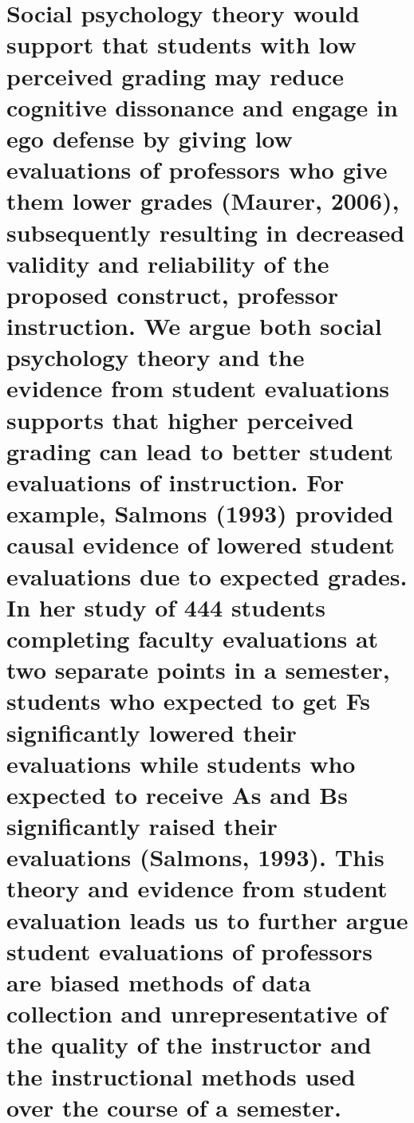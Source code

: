 \documentclass[man]{apa6}
\theoremstyle{definition}
\theoremstyle{definition}
\theoremstyle{definition}
\theoremstyle{remark}
\begin{document}
\section{Social psychology theory would support that students with low
perceived grading may reduce cognitive dissonance and engage in ego
defense by giving low evaluations of professors who give them lower
grades (Maurer, 2006), subsequently resulting in decreased validity and
reliability of the proposed construct, professor instruction. We argue
both social psychology theory and the evidence from student evaluations
supports that higher perceived grading can lead to better student
evaluations of instruction. For example, Salmons (1993) provided causal
evidence of lowered student evaluations due to expected grades. In her
study of 444 students completing faculty evaluations at two separate
points in a semester, students who expected to get Fs significantly
lowered their evaluations while students who expected to receive As and
Bs significantly raised their evaluations (Salmons, 1993). This theory
and evidence from student evaluation leads us to further argue student
evaluations of professors are biased methods of data collection and
unrepresentative of the quality of the instructor and the instructional
methods used over the course of a
semester.}\label{social-psychology-theory-would-support-that-students-with-low-perceived-grading-may-reduce-cognitive-dissonance-and-engage-in-ego-defense-by-giving-low-evaluations-of-professors-who-give-them-lower-grades-maurer2006-subsequently-resulting-in-decreased-validity-and-reliability-of-the-proposed-construct-professor-instruction.-we-argue-both-social-psychology-theory-and-the-evidence-from-student-evaluations-supports-that-higher-perceived-grading-can-lead-to-better-student-evaluations-of-instruction.-for-example-salmons1993-provided-causal-evidence-of-lowered-student-evaluations-due-to-expected-grades.-in-her-study-of-444-students-completing-faculty-evaluations-at-two-separate-points-in-a-semester-students-who-expected-to-get-fs-significantly-lowered-their-evaluations-while-students-who-expected-to-receive-as-and-bs-significantly-raised-their-evaluations-salmons1993.-this-theory-and-evidence-from-student-evaluation-leads-us-to-further-argue-student-evaluations-of-professors-are-biased-methods-of-data-collection-and-unrepresentative-of-the-quality-of-the-instructor-and-the-instructional-methods-used-over-the-course-of-a-semester.}
\end{document}
